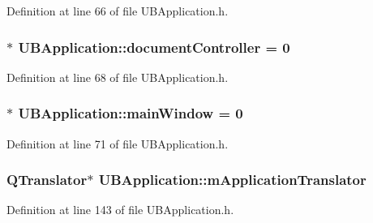 Definition at line 66 of file U\-B\-Application.\-h.

\hypertarget{class_u_b_application_a88b0c1b5b98707cc71dae42c5fbcae56}{
\subsubsection[{document\-Controller}]{ $\ast$ U\-B\-Application\-::document\-Controller = 0\hspace{0.3cm}{\ttfamily [static]}}}\label{d8/d81/class_u_b_application_a88b0c1b5b98707cc71dae42c5fbcae56}


Definition at line 68 of file U\-B\-Application.\-h.

\hypertarget{class_u_b_application_a369dfaccbdf3a0089ca67f093a7fd31d}{
\subsubsection[{main\-Window}]{ $\ast$ U\-B\-Application\-::main\-Window = 0\hspace{0.3cm}{\ttfamily [static]}}}\label{d8/d81/class_u_b_application_a369dfaccbdf3a0089ca67f093a7fd31d}


Definition at line 71 of file U\-B\-Application.\-h.

\hypertarget{class_u_b_application_a7acaf47118f8a15e10b47fd31d8ec2c9}{
\subsubsection[{m\-Application\-Translator}]{\setlength{\rightskip}{0pt plus 5cm}Q\-Translator$\ast$ U\-B\-Application\-::m\-Application\-Translator\hspace{0.3cm}{\ttfamily [protected]}}}\label{d8/d81/class_u_b_application_a7acaf47118f8a15e10b47fd31d8ec2c9}


Definition at line 143 of file U\-B\-Application.\-h.


